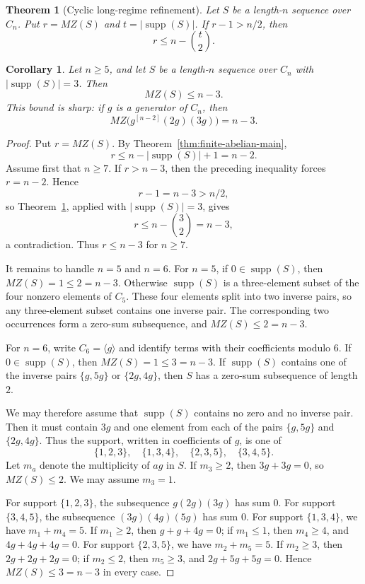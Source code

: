 \documentclass[10pt,a4paper]{amsart}
\newtheorem{theorem}{Theorem}
\newtheorem{corollary}{Corollary}
\DeclareMathOperator{\supp}{supp}
\begin{document}
\begin{theorem}[Cyclic long-regime refinement]\label{thm:savchev-chen-refinement}
Let $S$ be a length-$n$ sequence over $C_n$.  Put $r=MZ(S)$ and $t=|\supp(S)|$.  If $r-1>n/2$, then
\[
  r\le n-\binom{t}{2}.
\]
\end{theorem}

\begin{corollary}\label{cor:support-three-cyclic}
Let $n\ge 5$, and let $S$ be a length-$n$ sequence over $C_n$ with $|\supp(S)|=3$.  Then
\[
  MZ(S)\le n-3.
\]
This bound is sharp: if $g$ is a generator of $C_n$, then
\[
  MZ\bigl(g^{[n-2]}(2g)(3g)\bigr)=n-3.
\]
\end{corollary}

\begin{proof}
Put $r=MZ(S)$.  By Theorem~\ref{thm:finite-abelian-main},
\[
  r\le n-|\supp(S)|+1=n-2.
\]
Assume first that $n\ge 7$.  If $r>n-3$, then the preceding inequality forces $r=n-2$.  Hence
\[
  r-1=n-3>n/2,
\]
so Theorem~\ref{thm:savchev-chen-refinement}, applied with $|\supp(S)|=3$, gives
\[
  r\le n-\binom{3}{2}=n-3,
\]
a contradiction.  Thus $r\le n-3$ for $n\ge 7$.

It remains to handle $n=5$ and $n=6$.  For $n=5$, if $0\in\supp(S)$, then $MZ(S)=1\le 2=n-3$.  Otherwise $\supp(S)$ is a three-element subset of the four nonzero elements of $C_5$.  These four elements split into two inverse pairs, so any three-element subset contains one inverse pair.  The corresponding two occurrences form a zero-sum subsequence, and $MZ(S)\le 2=n-3$.

For $n=6$, write $C_6=\langle g\rangle$ and identify terms with their coefficients modulo $6$.  If $0\in\supp(S)$, then $MZ(S)=1\le 3=n-3$.  If $\supp(S)$ contains one of the inverse pairs $\{g,5g\}$ or $\{2g,4g\}$, then $S$ has a zero-sum subsequence of length $2$.

We may therefore assume that $\supp(S)$ contains no zero and no inverse pair.  Then it must contain $3g$ and one element from each of the pairs $\{g,5g\}$ and $\{2g,4g\}$.  Thus the support, written in coefficients of $g$, is one of
\[
  \{1,2,3\},\quad \{1,3,4\},\quad \{2,3,5\},\quad \{3,4,5\}.
\]
Let $m_a$ denote the multiplicity of $ag$ in $S$.  If $m_3\ge 2$, then $3g+3g=0$, so $MZ(S)\le 2$.  We may assume $m_3=1$.

For support $\{1,2,3\}$, the subsequence $g(2g)(3g)$ has sum $0$.  For support $\{3,4,5\}$, the subsequence $(3g)(4g)(5g)$ has sum $0$.  For support $\{1,3,4\}$, we have $m_1+m_4=5$.  If $m_1\ge 2$, then $g+g+4g=0$; if $m_1\le 1$, then $m_4\ge 4$, and $4g+4g+4g=0$.  For support $\{2,3,5\}$, we have $m_2+m_5=5$.  If $m_2\ge 3$, then $2g+2g+2g=0$; if $m_2\le 2$, then $m_5\ge 3$, and $2g+5g+5g=0$.  Hence $MZ(S)\le 3=n-3$ in every case.


\end{proof}
\end{document}
